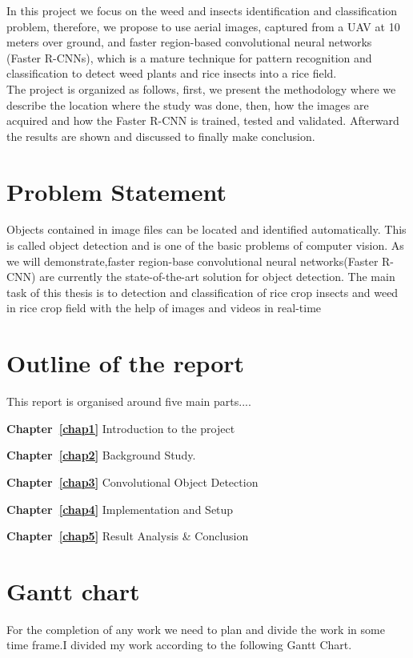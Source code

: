 In this project we focus on the weed and insects identification and classification problem, therefore, we propose to use aerial images, captured from a UAV at 10 meters over ground, and faster region-based convolutional neural networks (Faster R-CNNs), which is a mature technique for pattern recognition and classification to detect weed plants and rice insects into a rice field.\\

The project is organized as follows, first, we present the methodology where we describe the location where the study was done, then, how the images are acquired and how the Faster R-CNN is trained, tested and validated. Afterward the results are shown and discussed to finally make conclusion.

\section{Problem Statement}
Objects contained in image files can be located and identified automatically. This is called object detection and is one of the basic problems of computer vision. As we will demonstrate,faster region-base convolutional neural networks(Faster R-CNN) are currently the state-of-the-art solution for object detection. The main task of this thesis is to detection and classification of rice crop insects and weed in rice crop field with the help of images and videos in real-time




\section{Outline of the report}
This report is organised around five main parts....
\begin{onehalfspace}

{\bf Chapter~\ref{chap1}}  Introduction to the project
  
{\bf Chapter~\ref{chap2}}  Background Study.

{\bf Chapter~\ref{chap3}}  Convolutional Object Detection
 
{\bf Chapter~\ref{chap4}}  Implementation and Setup

{\bf Chapter~\ref{chap5}}  Result Analysis \& Conclusion

\end{onehalfspace}

\section{Gantt chart}
For the completion of any work we need to plan and divide the work in some time frame.I
divided my work according to the following Gantt Chart.

